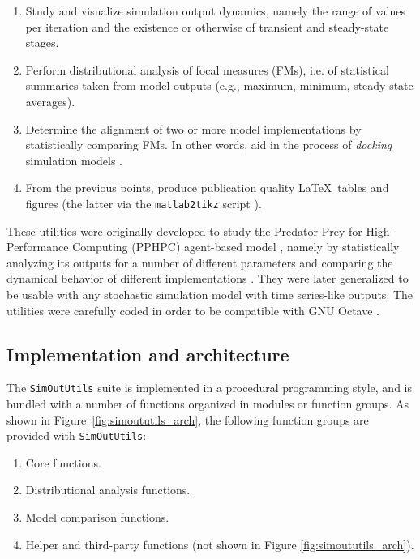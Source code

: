 \documentclass{article}
\newcommand{\progfunc}{\textnhtt}
\newcommand{\swpackage}{\texttt}
\begin{document}
\begin{enumerate}
\item Study and visualize simulation output dynamics, namely the range of values per iteration and the existence or otherwise of transient and steady-state stages.
\item Perform distributional analysis of focal measures (FMs), i.e. of statistical summaries taken from model outputs (e.g., maximum, minimum, steady-state averages).
\item Determine the alignment of two or more model implementations by statistically comparing FMs. In other words, aid in the process of \textit{docking} simulation models \cite{axtell1996aligning}.
\item From the previous points, produce publication quality \LaTeX\ tables and figures (the latter via the \progfunc{matlab2tikz} script \cite{schlomer2008matlab}).
\end{enumerate}

These utilities were originally developed to study the Predator-Prey for High-Performance Computing (PPHPC) agent-based model \cite{fachada2015template}, namely by statistically analyzing its outputs for a number of different parameters and comparing the dynamical behavior of different implementations \cite{fachada2015template,fachada2015parallelization,fachada2015model}. They were later generalized to be usable with any stochastic simulation model with time series-like outputs. The utilities were carefully coded in order to be compatible with GNU Octave \cite{eaton1997gnu}.

\subsection*{Implementation and architecture}

The \swpackage{SimOutUtils} suite is implemented in a procedural programming style, and is bundled with a number of functions organized in modules or function groups. As shown in Figure~\ref{fig:simoututils_arch}, the following function groups are provided with \swpackage{SimOutUtils}:

\begin{enumerate}
\item Core functions.
\item Distributional analysis functions.
\item Model comparison functions.
\item Helper and third-party functions (not shown in Figure \ref{fig:simoututils_arch}).
\end{enumerate}
\end{document}
